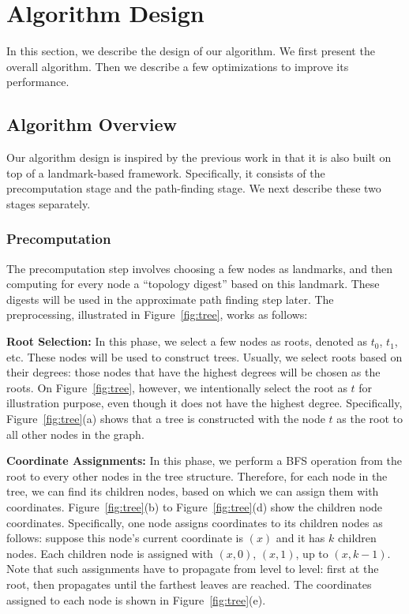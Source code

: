\section{Algorithm Design}
\label{design}

In this section, we describe the design of our algorithm. We first present the overall algorithm. Then we describe a few optimizations to improve its performance.

\subsection{Algorithm Overview}
\label{architecture}

Our algorithm design is inspired by the previous work in that it is also built on top of a landmark-based framework. Specifically, it consists of the precomputation stage and the path-finding stage. We next describe these two stages separately.

\subsubsection{Precomputation}

The precomputation step involves choosing a few nodes as landmarks, and then computing for every node a ``topology digest'' based on this landmark. These digests will be used in the approximate path finding step later. The preprocessing, illustrated in Figure~\ref{fig:tree}, works as follows:

\textbf{Root Selection:} In this phase, we select a few nodes as roots, denoted as $t_0$, $t_1$, etc. These nodes will be used to construct trees. Usually, we select roots based on their degrees: those nodes that have the highest degrees will be chosen as the roots. On Figure~\ref{fig:tree}, however, we intentionally select the root as $t$ for illustration purpose, even though it does not have the highest degree. Specifically, Figure~\ref{fig:tree}(a) shows that a tree is constructed with the node $t$ as the root to all other nodes in the graph.

\textbf{Coordinate Assignments:} In this phase, we perform a BFS operation from the root to every other nodes in the tree structure. Therefore, for each node in the tree, we can find its children nodes, based on which we can assign them with coordinates. Figure~\ref{fig:tree}(b) to Figure~\ref{fig:tree}(d) show the children node coordinates. Specifically, one node assigns coordinates to its children nodes as follows: suppose this node's current coordinate is $(x)$ and it has $k$ children nodes. Each children node is assigned with $(x, 0)$, $(x,1)$, up to $(x,k-1)$. Note that such assignments have to propagate from level to level: first at the root, then propagates until the farthest leaves are reached. The coordinates assigned to each node is shown in Figure~\ref{fig:tree}(e).


